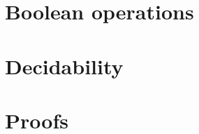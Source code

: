 \documentclass[orivec]{llncs}
\begin{document}
\section{Boolean operations}\label{sec:boolean-operations}


\section{Decidability}\label{sec:decidability}

\appendix
\section{Proofs}




\end{document}
